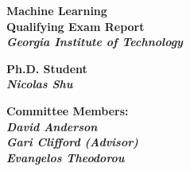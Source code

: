 \thispagestyle{empty}

\begin{center}
	\vfill
    \vspace*{0.2\textheight}

	\Huge
	\bf{Machine Learning \\Qualifying Exam Report} \\
	\it{Georgia Institute of Technology}
	\vskip 1cm

	\Large
	\bf{Ph.D. Student} \\
	\it{Nicolas Shu}
	\vskip 1cm


	\Large
	\bf{Committee Members:} \\
	\it{David Anderson} \\
	\it{Gari Clifford (Advisor)} \\
	\it{Evangelos Theodorou}

    \normalsize

\end{center}
